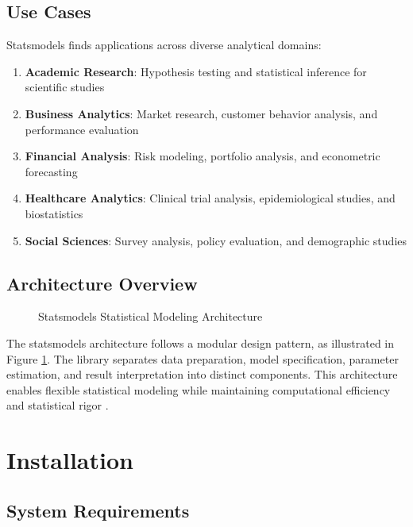 \subsection{Use Cases}
\label{subsec:usecases}

Statsmodels finds applications across diverse analytical domains:

\begin{enumerate}
	\item \textbf{Academic Research}: Hypothesis testing and statistical inference for scientific studies
	\item \textbf{Business Analytics}: Market research, customer behavior analysis, and performance evaluation
	\item \textbf{Financial Analysis}: Risk modeling, portfolio analysis, and econometric forecasting
	\item \textbf{Healthcare Analytics}: Clinical trial analysis, epidemiological studies, and biostatistics
	\item \textbf{Social Sciences}: Survey analysis, policy evaluation, and demographic studies
\end{enumerate}

\subsection{Architecture Overview}
\label{subsec:architecture}

\begin{figure}[H]
	\centering
	
	\caption{Statsmodels Statistical Modeling Architecture \cite{Statsmodels:2024}}
	\label{fig:statsmodels_architecture}
\end{figure}

The statsmodels architecture follows a modular design pattern, as illustrated in Figure \ref{fig:statsmodels_architecture}. The library separates data preparation, model specification, parameter estimation, and result interpretation into distinct components. This architecture enables flexible statistical modeling while maintaining computational efficiency and statistical rigor \cite{Statsmodels:2024}.

\clearpage

\section{Installation}
\label{sec:installation}

\subsection{System Requirements}
\label{subsec:system_requirements}


